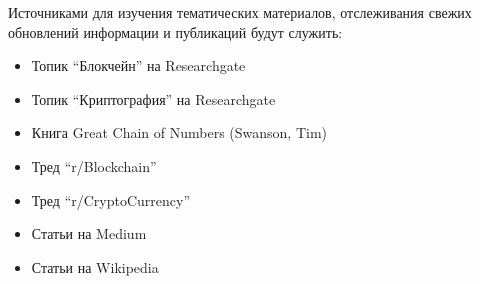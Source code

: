Источниками для изучения тематических материалов, отслеживания свежих обновлений информации и публикаций будут служить:

\begin{itemize}
    \item Топик ``Блокчейн'' на Researchgate \cite{rg1}
    \item Топик ``Криптография'' на Researchgate \cite{rg2}
    \item Книга Great Chain of Numbers (Swanson, Tim) \cite{TimSwanson2014}
    \item Тред ``r/Blockchain'' \cite{rd1}
    \item Тред ``r/CryptoCurrency'' \cite{rd2}
    \item Статьи на Medium \cite{AshishKotsbtechcdac2018}
    \item Статьи на Wikipedia \cite{wikip}
\end{itemize}

